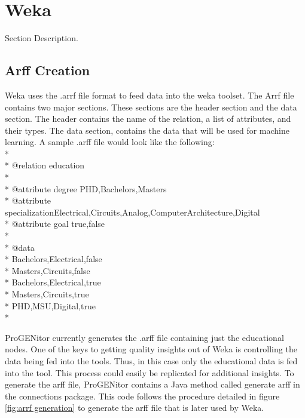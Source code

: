\section{Weka}
\label{sect:weka}
Section Description.  

\subsection{Arff Creation}
Weka uses the .arrf file format to feed data into the weka toolset.  The Arrf
file contains two major sections.  These sections are the header section and the
data section.\cite{arrf}  The header contains the name of the relation, a list
of attributes, and their types.  The data section, contains the data that will
be used for machine learning.  A sample .arff file would look like the
following:
\\*
\\*
@relation education\\*
\\*
@attribute degree {PHD,Bachelors,Masters}\\*
@attribute
specialization{Electrical,Circuits,Analog,ComputerArchitecture,Digital}\\*
@attribute goal {true,false}\\*
\\*
@data\\*
Bachelors,Electrical,false\\*
Masters,Circuits,false\\*
Bachelors,Electrical,true\\*
Masters,Circuits,true\\*
PHD,MSU,Digital,true\\*

ProGENitor currently generates the .arff file containing just the educational
nodes.  One of the keys to getting quality insights out of Weka is controlling
the data being fed into the tools.  Thus, in this case only the educational data
is fed into the tool.  This process could easily be replicated for additional
insights.  To generate the arff file, ProGENitor contains a Java method called
generate arff in the connections package.  This code follows the procedure
detailed in figure \ref{fig:arrf generation} to generate the arff file that is
later used by Weka.

\usetikzlibrary{shapes,arrows,chains}


